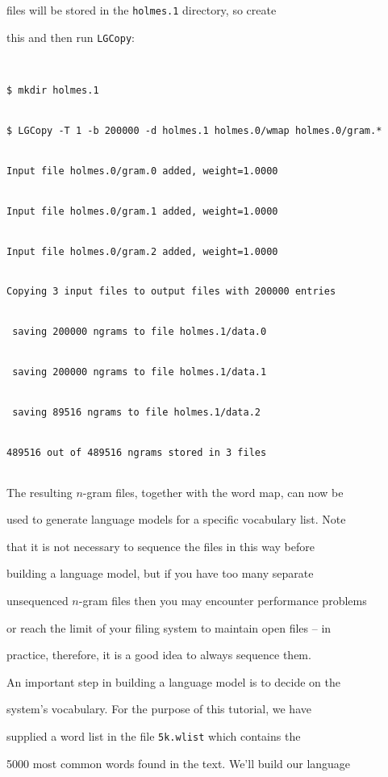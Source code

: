 files will be stored in the \texttt{holmes.1} directory, so create


this and then run {\tt LGCopy}:


\begin{verbatim}


$ mkdir holmes.1


$ LGCopy -T 1 -b 200000 -d holmes.1 holmes.0/wmap holmes.0/gram.*


Input file holmes.0/gram.0 added, weight=1.0000


Input file holmes.0/gram.1 added, weight=1.0000


Input file holmes.0/gram.2 added, weight=1.0000


Copying 3 input files to output files with 200000 entries


 saving 200000 ngrams to file holmes.1/data.0


 saving 200000 ngrams to file holmes.1/data.1


 saving 89516 ngrams to file holmes.1/data.2


489516 out of 489516 ngrams stored in 3 files


\end{verbatim}


The resulting $n$-gram files, together with the word map, can now be


used to generate language models for a specific vocabulary list.  Note


that it is not necessary to sequence the files in this way before


building a language model, but if you have too many separate


unsequenced $n$-gram files then you may encounter performance problems


or reach the limit of your filing system to maintain open files -- in


practice, therefore, it is a good idea to always sequence them.







An important step in building a language model is to decide on the


system's vocabulary. For the purpose of this tutorial, we have


supplied a word list in the file \texttt{5k.wlist} which contains the


5000 most common words found in the text.  We'll build our language


